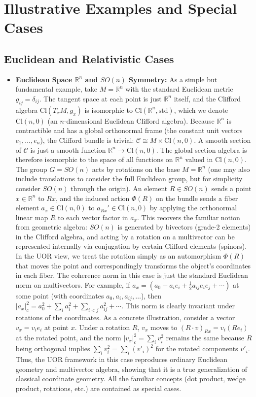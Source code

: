 \documentclass[12pt]{article}
\newcommand{\Cl}{\mathrm{Cl}}
\begin{document}
\section{Illustrative Examples and Special Cases}

\subsection{Euclidean and Relativistic Cases}
\begin{itemize}
    \item \textbf{Euclidean Space $\mathbb{R}^n$ and $SO(n)$ Symmetry:} As a simple but fundamental example, take $M = \mathbb{R}^n$ with the standard Euclidean metric $g_{ij} = \delta_{ij}$. The tangent space at each point is just $\mathbb{R}^n$ itself, and the Clifford algebra $\Cl(T_x M, g_x)$ is isomorphic to $\Cl(\mathbb{R}^n,\text{std})$, which we denote $\Cl(n,0)$ (an $n$-dimensional Euclidean Clifford algebra). Because $\mathbb{R}^n$ is contractible and has a global orthonormal frame (the constant unit vectors $e_1,\dots,e_n$), the Clifford bundle is trivial: $\mathcal{C} \cong M \times \Cl(n,0)$. A smooth section of $\mathcal{C}$ is just a smooth function $\mathbb{R}^n \to \Cl(n,0)$. The global section algebra is therefore isomorphic to the space of all functions on $\mathbb{R}^n$ valued in $\Cl(n,0)$. The group $G = SO(n)$ acts by rotations on the base $M = \mathbb{R}^n$ (one may also include translations to consider the full Euclidean group, but for simplicity consider $SO(n)$ through the origin). An element $R \in SO(n)$ sends a point $x \in \mathbb{R}^n$ to $R x$, and the induced action $\Phi(R)$ on the bundle sends a fiber element $a_x \in \Cl(n,0)$ to $a_{R x}' \in \Cl(n,0)$ by applying the orthonormal linear map $R$ to each vector factor in $a_x$. This recovers the familiar notion from geometric algebra: $SO(n)$ is generated by bivectors (grade-2 elements) in the Clifford algebra, and acting by a rotation on a multivector can be represented internally via conjugation by certain Clifford elements (spinors). In the UOR view, we treat the rotation simply as an automorphism $\Phi(R)$ that moves the point and correspondingly transforms the object’s coordinates in each fiber. The coherence norm in this case is just the standard Euclidean norm on multivectors. For example, if $a_x = (a_0 + a_i e_i + \frac{1}{2}a_{ij} e_i e_j + \cdots)$ at some point (with coordinates $a_0, a_i, a_{ij}, \dots$), then $|a_x|_c^2 = a_0^2 + \sum_i a_i^2 + \sum_{i<j} a_{ij}^2 + \cdots$. This norm is clearly invariant under rotations of the coordinates. As a concrete illustration, consider a vector $v_x = v_i e_i$ at point $x$. Under a rotation $R$, $v_x$ moves to $(R\cdot v)_{R x} = v_i (R e_i)$ at the rotated point, and the norm $|v_x|_c^2 = \sum_i v_i^2$ remains the same because $R$ being orthogonal implies $\sum_i v_i^2 = \sum_i (v'_i)^2$ for the rotated components $v'_i$. Thus, the UOR framework in this case reproduces ordinary Euclidean geometry and multivector algebra, showing that it is a true generalization of classical coordinate geometry. All the familiar concepts (dot product, wedge product, rotations, etc.) are contained as special cases.


\end{itemize}
\end{document}
